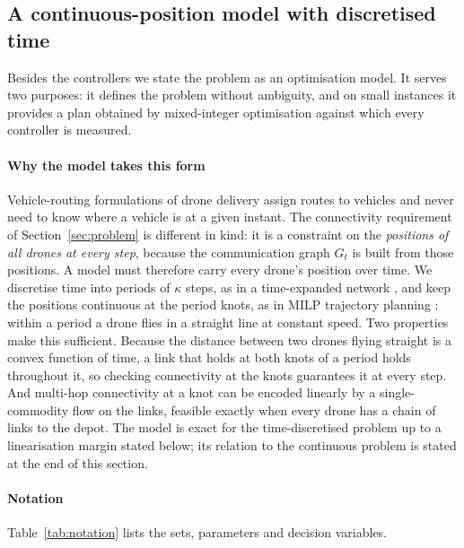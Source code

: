 \documentclass[final,5p,times,twocolumn]{elsarticle}
\begin{document}
\subsection{A continuous-position model with discretised time}
\label{sec:cont-model}
\label{sec:milp-model}

Besides the controllers we state the problem as an optimisation model. It serves two purposes:
it defines the problem without ambiguity, and on small instances it provides a plan obtained by
mixed-integer optimisation against which every controller is measured.

\paragraph{Why the model takes this form}
Vehicle-routing formulations of drone delivery \cite{murray2015,agatz2018} assign routes to
vehicles and never need to know where a vehicle is at a given instant. The connectivity
requirement of Section~\ref{sec:problem} is different in kind: it is a constraint on the
\emph{positions of all drones at every step}, because the communication graph $G_t$ is built from
those positions. A model must therefore carry every drone's position over time. We discretise
time into periods of $\kappa$ steps, as in a time-expanded network \cite{ford1962}, and keep the
positions continuous at the period knots, as in MILP trajectory planning
\cite{richards2002,schouwenaars2001}: within a period a drone flies in a straight line at constant
speed. Two properties make this sufficient. Because the distance between two drones flying straight
is a convex function of time, a link that holds at both knots of a period holds throughout it, so
checking connectivity at the knots guarantees it at every step. And multi-hop connectivity at a
knot can be encoded linearly by a single-commodity flow on the links, feasible exactly when every
drone has a chain of links to the depot. The model is exact for the time-discretised problem up to
a linearisation margin stated below; its relation to the continuous problem is stated at the end
of this section.

\paragraph{Notation}
Table~\ref{tab:notation} lists the sets, parameters and decision variables.
\end{document}
